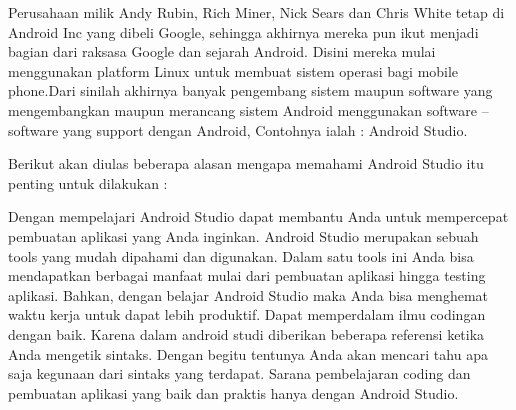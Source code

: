 Perusahaan milik Andy Rubin, Rich Miner, Nick Sears dan Chris White tetap di Android Inc yang dibeli Google, sehingga akhirnya mereka pun ikut  menjadi bagian dari raksasa Google dan sejarah Android. Disini mereka mulai menggunakan platform Linux untuk membuat sistem operasi bagi mobile phone.Dari sinilah akhirnya banyak pengembang sistem maupun software yang mengembangkan maupun merancang sistem Android menggunakan software – software yang support dengan Android, Contohnya ialah : Android Studio.

Berikut akan diulas beberapa alasan mengapa memahami Android Studio itu penting untuk dilakukan :

Dengan mempelajari Android Studio dapat membantu Anda untuk mempercepat pembuatan aplikasi yang Anda inginkan.
Android Studio merupakan sebuah tools yang mudah dipahami dan digunakan.
Dalam satu tools ini Anda bisa mendapatkan berbagai manfaat mulai dari pembuatan aplikasi hingga testing aplikasi.
Bahkan, dengan belajar Android Studio maka Anda bisa menghemat waktu kerja untuk dapat lebih produktif.
Dapat memperdalam ilmu codingan dengan baik. Karena dalam android studi diberikan beberapa referensi ketika Anda mengetik sintaks. Dengan begitu tentunya Anda akan mencari tahu apa saja kegunaan dari sintaks yang terdapat.
Sarana pembelajaran coding dan pembuatan aplikasi yang baik dan praktis hanya dengan Android Studio.

